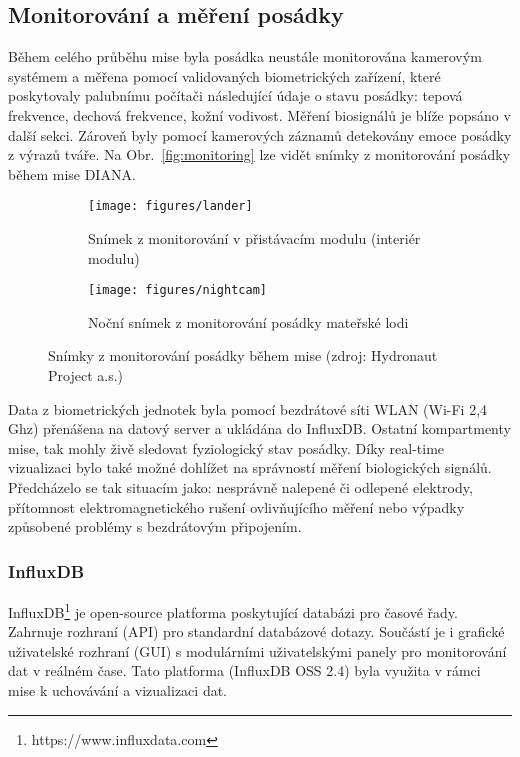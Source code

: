 \subsection{Monitorování a měření posádky}
\label{subsec:monitorovani posadky}
Během celého průběhu mise byla posádka neustále monitorována kamerovým systémem
a měřena pomocí validovaných biometrických zařízení, které poskytovaly palubnímu
počítači následující údaje o stavu posádky: tepová frekvence, dechová frekvence,
kožní vodivost. Měření biosignálů je blíže popsáno v další sekci. Zároveň byly
pomocí kamerových záznamů detekovány emoce posádky z výrazů tváře. Na
Obr.~\ref{fig:monitoring} lze vidět snímky z monitorování posádky během mise
DIANA.

\begin{figure}[h]
    \begin{subfigure}[h]{0.48\linewidth}
        \texttt{[image: figures/lander]}
        \caption{Snímek z monitorování v přistávacím modulu (interiér modulu)}
    \end{subfigure}
    \hfill
    \begin{subfigure}[h]{0.48\linewidth}
        \texttt{[image: figures/nightcam]}
        \caption{Noční snímek z monitorování posádky mateřské lodi}
    \end{subfigure}
    \caption{Snímky z monitorování posádky během mise (zdroj: Hydronaut Project a.s.)}
\end{figure}

Data z biometrických jednotek byla pomocí bezdrátové síti WLAN (Wi-Fi 2,4 Ghz)
přenášena na datový server a ukládána do InfluxDB. Ostatní kompartmenty mise,
tak mohly živě sledovat fyziologický stav posádky. Díky real-time vizualizaci
bylo také možné dohlížet na správností měření biologických signálů. Předcházelo
se tak situacím jako: nesprávně nalepené či odlepené elektrody, přítomnost
elektromagnetického rušení ovlivňujícího měření nebo výpadky způsobené problémy
s bezdrátovým připojením.

\subsubsection{InfluxDB}
\label{subsec:influx}
InfluxDB\footnote{https://www.influxdata.com} je open-source platforma
poskytující databázi pro časové řady. Zahrnuje rozhraní (API) pro standardní
databázové dotazy. Součástí je i grafické uživatelské rozhraní (GUI) s
modulárními uživatelskými panely pro monitorování dat v reálném čase. Tato
platforma (InfluxDB OSS 2.4) byla využita v rámci mise k uchovávání a
vizualizaci dat.

